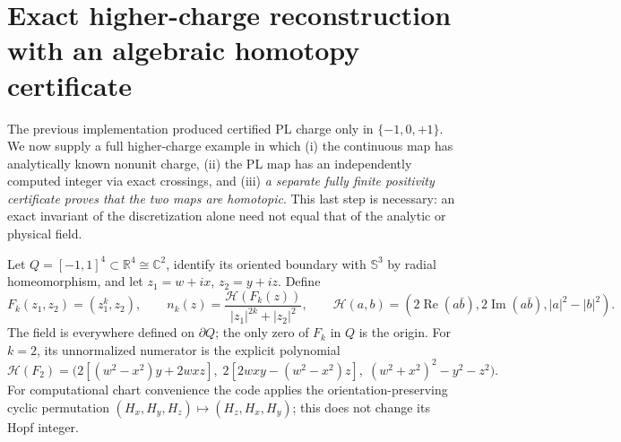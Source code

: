 \documentclass[aps,prd,onecolumn,notitlepage,11pt,superscriptaddress,longbibliography]{revtex4-2}
\newcommand{\Sph}{\mathbb S}
\begin{document}
\section{Exact higher-charge reconstruction with an algebraic homotopy certificate}
\label{sec:charge-two}

The previous implementation produced certified PL charge only in $\{-1,0,+1\}$. We now supply a full higher-charge example in which (i) the continuous map has analytically known nonunit charge, (ii) the PL map has an independently computed integer via exact crossings, and (iii) \emph{a separate fully finite positivity certificate proves that the two maps are homotopic}. This last step is necessary: an exact invariant of the discretization alone need not equal that of the analytic or physical field.

Let $Q=[-1,1]^4\subset\mathbb R^4\cong\mathbb C^2$, identify its oriented boundary with $\Sph^3$ by radial homeomorphism, and let $z_1=w+ix$, $z_2=y+iz$. Define
\begin{equation}\label{eq:v9-map}
 F_k(z_1,z_2)=(z_1^k,z_2),\qquad
 n_k(z)=\frac{\mathcal H(F_k(z))}{|z_1|^{2k}+|z_2|^2},\qquad
 \mathcal H(a,b)=(2\operatorname{Re}(a\bar b),2\operatorname{Im}(a\bar b),|a|^2-|b|^2).
\end{equation}
The field is everywhere defined on $\partial Q$; the only zero of $F_k$ in $Q$ is the origin. For $k=2$, its unnormalized numerator is the explicit polynomial
\begin{equation}\label{eq:v9-polynomial}
 \mathcal H(F_2)=\bigl(2[(w^2-x^2)y+2wxz],\;2[2wxy-(w^2-x^2)z],\;(w^2+x^2)^2-y^2-z^2\bigr).
\end{equation}
For computational chart convenience the code applies the orientation-preserving cyclic permutation $(H_x,H_y,H_z)\mapsto(H_z,H_x,H_y)$; this does not change its Hopf integer.
\end{document}
